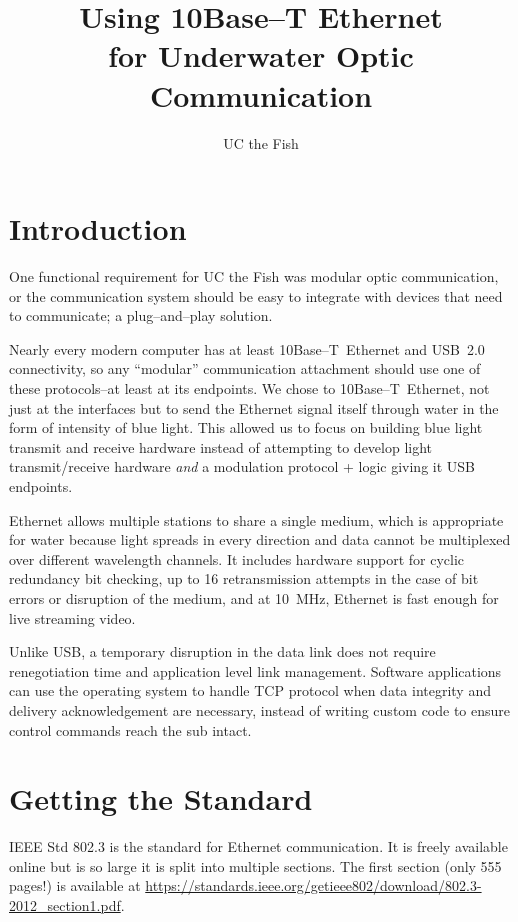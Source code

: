 ﻿\documentclass{article}
\begin{document}
\title{Using 10Base--T Ethernet\\for Underwater Optic Communication}
\author{UC the Fish}

\maketitle

\section{Introduction}

One functional requirement for UC the Fish was modular optic communication,
or the communication system should be easy to integrate with devices that need to
communicate; a plug--and--play solution.

Nearly every modern computer has at least \mbox{10Base--T Ethernet} and
\mbox{USB 2.0} connectivity, so any ``modular'' communication attachment
should use one of these protocols--at least at its endpoints.
We chose to \mbox{10Base--T Ethernet}, not just at the interfaces but to
send the Ethernet signal itself through water in the form of intensity
of blue light.
This allowed us to focus on building blue light transmit and receive
hardware instead of attempting to develop light transmit/receive hardware
\textit{and} a modulation protocol + logic giving it USB endpoints.

Ethernet allows multiple stations to share a single medium,
which is appropriate for water because light spreads in every direction
and data cannot be multiplexed over different wavelength channels. 
It includes hardware support for cyclic redundancy bit checking,
up to 16 retransmission attempts in the case of bit errors or disruption
of the medium, and at \mbox{10 MHz}, Ethernet is fast enough 
for live streaming video.

Unlike USB, a temporary disruption in the data link does not require
renegotiation time and application level link management.
Software applications can use the operating system to handle TCP protocol
when data integrity and delivery acknowledgement are necessary, instead
of writing custom code to ensure control commands reach the sub intact.

\section{Getting the Standard}

IEEE Std 802.3 is the standard for Ethernet communication.
It is freely available online but is so large it is split into multiple
sections.
The first section (only 555 pages!) is available at
\url{https://standards.ieee.org/getieee802/download/802.3-2012\_section1.pdf}.
\end{document}
